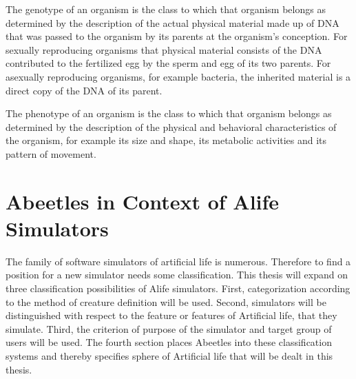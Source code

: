 \documentclass[a4paper,12pt]{report}
\begin{document}
The genotype of an organism is the class to which that organism belongs as determined by the description of the actual physical material made up of DNA that was passed to the organism by its parents at the organism's conception. For sexually reproducing organisms that physical material consists of the DNA contributed to the fertilized egg by the sperm and egg of its two parents. For asexually reproducing organisms, for example bacteria, the inherited material is a direct copy of the DNA of its parent. 

The phenotype of an organism is the class to which that organism belongs as determined by the description of the physical and behavioral characteristics of the organism, for example its size and shape, its metabolic activities and its pattern of movement.
\cite{GenPhen}



\chapter{Abeetles in Context of Alife Simulators} 
The family of software simulators of artificial life is numerous. Therefore to find a position for a new simulator needs some classification. This thesis will expand on three classification possibilities of Alife simulators. First, categorization according to the method of creature definition will be used. Second, simulators will be distinguished with respect to the feature or features of Artificial life, that they simulate. Third, the criterion of purpose of the simulator and target group of users will be used. The fourth section places Abeetles into these classification systems and thereby specifies sphere of Artificial life that will be dealt in this thesis.
\end{document}
